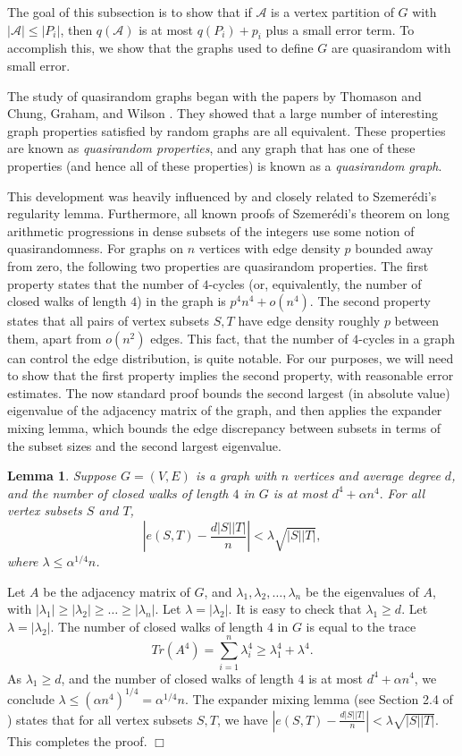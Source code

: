 \documentclass[11pt]{article}
\newtheorem{lemma}{Lemma}[section]
\newenvironment{proof}
      {\medskip\noindent{\bf Proof:}\hspace{1mm}}
      {\hfill$\Box$\medskip}
\begin{document}
The goal of this subsection is to show that if $\mathcal{A}$ is a vertex
partition of $G$ with $|\mathcal{A}| \leq |P_i|$, then $q(\mathcal{A})$ is at most $q(P_{i})+p_i$ plus a small error term. To accomplish this, we show that the graphs used to define $G$ are quasirandom with small error.

The study of quasirandom graphs began with the papers by Thomason \cite{Th} and
Chung, Graham, and Wilson \cite{CGW}. They showed that a large number of
interesting graph properties satisfied by random graphs are all equivalent.
These properties are known as {\it quasirandom properties}, and any graph that
has one of these properties (and hence all of these properties) is known as a
{\it quasirandom graph}.

This development was heavily influenced by and closely related to
Szemer\'edi's regularity lemma. Furthermore, all
known proofs of Szemer\'edi's theorem on long arithmetic progressions in dense
subsets of the integers use some notion of quasirandomness. For graphs on $n$
vertices with edge density $p$ bounded away from zero, the following two
properties are quasirandom properties. The first property states that the
number of $4$-cycles (or, equivalently, the number of closed walks of length
$4$) in the graph is $p^4n^4+o(n^4)$. The second property states that all pairs
of vertex subsets $S,T$ have edge density roughly $p$ between them, apart from
$o(n^2)$ edges. This fact, that the number of $4$-cycles in a graph can control
the edge distribution, is quite notable. For our purposes, we will need to show
that the first property implies the second property, with reasonable error
estimates. The now standard proof bounds the second largest (in absolute value)
eigenvalue of the adjacency matrix of the graph, and then applies the expander
mixing lemma, which bounds the edge discrepancy between subsets in terms of the
subset sizes and the second largest eigenvalue.

\begin{lemma}\label{p1p2}
Suppose $G=(V,E)$ is a graph with $n$ vertices and average degree $d$, and the
number of closed walks of length $4$ in $G$ is at most $d^4+\alpha n^4.$ For all vertex subsets $S$ and $T$,
$$|e(S,T)-\frac{d|S||T|}{n}|<\lambda\sqrt{|S||T|},$$ where $\lambda \leq
\alpha^{1/4}n$.
\end{lemma}
\begin{proof}
Let $A$ be the adjacency matrix of $G$, and
$\lambda_1,\lambda_2,\ldots,\lambda_n$ be the eigenvalues of $A$, with
$|\lambda_1| \geq |\lambda_2| \geq \ldots \geq |\lambda_n|$. Let
$\lambda=|\lambda_2|$.
It is easy to check that $\lambda_1 \geq d$. Let $\lambda=|\lambda_2|$. The
number of closed walks of length $4$ in $G$ is equal to the trace
$$Tr(A^4)=\sum_{i=1}^n \lambda_i^4 \geq \lambda_1^4+\lambda^4.$$
As $\lambda_1 \geq d$, and the number of closed walks of length $4$ is at most
$d^4+\alpha n^4$, we conclude $\lambda \leq (\alpha n^4)^{1/4}=\alpha^{1/4}n.$
The expander mixing lemma (see Section 2.4 of \cite{KrSu}) states that for all
vertex subsets $S,T$, we have $|e(S,T)-\frac{d|S||T|}{n}|<\lambda
\sqrt{|S||T|}$. This completes the proof.
\end{proof}
\end{document}
